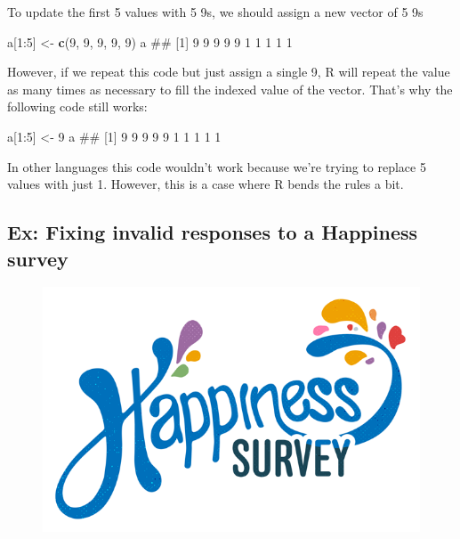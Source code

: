 \documentclass[]{book}
\newenvironment{Shaded}{\begin{snugshade}}{\end{snugshade}}
\newcommand{\KeywordTok}[1]{\textcolor[rgb]{0.13,0.29,0.53}{\textbf{{#1}}}}
\newcommand{\DecValTok}[1]{\textcolor[rgb]{0.00,0.00,0.81}{{#1}}}
\newcommand{\StringTok}[1]{\textcolor[rgb]{0.31,0.60,0.02}{{#1}}}
\newcommand{\NormalTok}[1]{{#1}}
\theoremstyle{definition}
\theoremstyle{definition}
\theoremstyle{remark}
\begin{document}
To update the first 5 values with 5 9s, we should assign a new vector of
5 9s

\begin{Shaded}
\begin{Highlighting}[]
\NormalTok{a[}\DecValTok{1}\NormalTok{:}\DecValTok{5}\NormalTok{] <-}\StringTok{ }\KeywordTok{c}\NormalTok{(}\DecValTok{9}\NormalTok{, }\DecValTok{9}\NormalTok{, }\DecValTok{9}\NormalTok{, }\DecValTok{9}\NormalTok{, }\DecValTok{9}\NormalTok{)}
\NormalTok{a}
\NormalTok{##  [1] 9 9 9 9 9 1 1 1 1 1}
\end{Highlighting}
\end{Shaded}

However, if we repeat this code but just assign a single 9, R will
repeat the value as many times as necessary to fill the indexed value of
the vector. That's why the following code still works:

\begin{Shaded}
\begin{Highlighting}[]
\NormalTok{a[}\DecValTok{1}\NormalTok{:}\DecValTok{5}\NormalTok{] <-}\StringTok{ }\DecValTok{9}
\NormalTok{a}
\NormalTok{##  [1] 9 9 9 9 9 1 1 1 1 1}
\end{Highlighting}
\end{Shaded}

In other languages this code wouldn't work because we're trying to
replace 5 values with just 1. However, this is a case where R bends the
rules a bit.

\subsection{Ex: Fixing invalid responses to a Happiness
survey}\label{ex-fixing-invalid-responses-to-a-happiness-survey}

\begin{figure}

{\centering \includegraphics[width=0.5\linewidth]{images/happiness} 

}

\end{figure}
\end{document}
